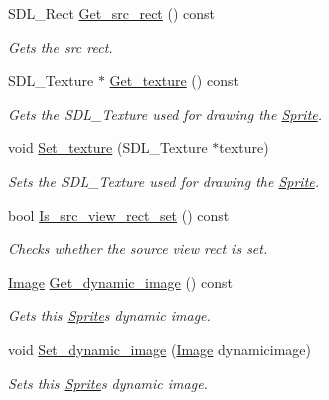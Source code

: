 \begin{DoxyCompactItemize}
S\+D\+L\+\_\+\+Rect \hyperlink{classjetfuel_1_1draw_1_1Sprite_ab3e7bda170f41633ec80408b639286db}{Get\+\_\+src\+\_\+rect} () const
\begin{DoxyCompactList}\small\item\em Gets the src rect. \end{DoxyCompactList}\item 
S\+D\+L\+\_\+\+Texture $\ast$ \hyperlink{classjetfuel_1_1draw_1_1Sprite_ad2d60845bf4e9915b162b07e0d96bf76}{Get\+\_\+texture} () const
\begin{DoxyCompactList}\small\item\em Gets the S\+D\+L\+\_\+\+Texture used for drawing the \hyperlink{classjetfuel_1_1draw_1_1Sprite}{Sprite}. \end{DoxyCompactList}\item 
void \hyperlink{classjetfuel_1_1draw_1_1Sprite_aa44e34d0f40435ad48d0bf2ccb5c25e0}{Set\+\_\+texture} (S\+D\+L\+\_\+\+Texture $\ast$texture)
\begin{DoxyCompactList}\small\item\em Sets the S\+D\+L\+\_\+\+Texture used for drawing the \hyperlink{classjetfuel_1_1draw_1_1Sprite}{Sprite}. \end{DoxyCompactList}\item 
bool \hyperlink{classjetfuel_1_1draw_1_1Sprite_a31b6b5ee62f3298577bbf78ad7b18cdf}{Is\+\_\+src\+\_\+view\+\_\+rect\+\_\+set} () const
\begin{DoxyCompactList}\small\item\em Checks whether the source view rect is set. \end{DoxyCompactList}\item 
\hyperlink{classjetfuel_1_1draw_1_1Image}{Image} \hyperlink{classjetfuel_1_1draw_1_1Sprite_a9c750d8c54004aa7e9b2de82b46bdb12}{Get\+\_\+dynamic\+\_\+image} () const
\begin{DoxyCompactList}\small\item\em Gets this \hyperlink{classjetfuel_1_1draw_1_1Sprite}{Sprite}\textquotesingle{}s dynamic image. \end{DoxyCompactList}\item 
void \hyperlink{classjetfuel_1_1draw_1_1Sprite_a0dfe3a796662980c612833768a785450}{Set\+\_\+dynamic\+\_\+image} (\hyperlink{classjetfuel_1_1draw_1_1Image}{Image} dynamicimage)
\begin{DoxyCompactList}\small\item\em Sets this \hyperlink{classjetfuel_1_1draw_1_1Sprite}{Sprite}\textquotesingle{}s dynamic image. \end{DoxyCompactList}\item 

\end{DoxyCompactItemize}
